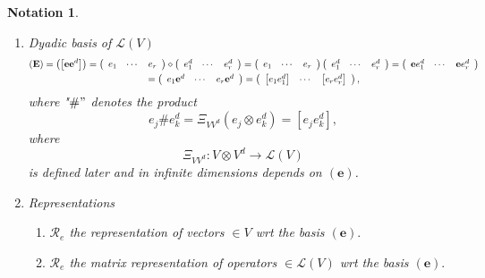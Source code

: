 \documentclass[aps,preprint]{revtex4}%
\newtheorem{notation}[theorem]{Notation}
\begin{document}
\begin{notation}
\begin{enumerate}
\item Dyadic basis of $\mathcal{L}\left(  V\right)  $%
\begin{gather}
\left(  \mathbf{E}\right)  =\left(  \left[  \mathbf{ee}^{d}\right]  \right)
=\left(
\begin{array}
[c]{ccc}%
e_{1} & \cdots & e_{r}%
\end{array}
\right)  \diamond\left(
\begin{array}
[c]{ccc}%
e_{1}^{d} & \cdots & e_{r}^{d}%
\end{array}
\right)  =\left(
\begin{array}
[c]{ccc}%
e_{1} & \cdots & e_{r}%
\end{array}
\right)  \left(
\begin{array}
[c]{ccc}%
e_{1}^{d} & \cdots & e_{r}^{d}%
\end{array}
\right)  =\left(
\begin{array}
[c]{ccc}%
\mathbf{e}e_{1}^{d} & \cdots & \mathbf{e}e_{r}^{d}%
\end{array}
\right) \\
=\left(
\begin{array}
[c]{ccc}%
e_{1}\mathbf{e}^{d} & \cdots & e_{r}\mathbf{e}^{d}%
\end{array}
\right)  =\left(
\begin{array}
[c]{ccc}%
\left[  e_{1}e_{1}^{d}\right]  & \cdots & \left[  e_{r}e_{r}^{d}\right]
\end{array}
\right)  ,
\end{gather}
where "$\#"$ denotes the product
\begin{equation}
e_{j}\#e_{k}^{d}=\Xi_{VV^{d}}\left(  e_{j}\otimes e_{k}^{d}\right)  =\left[
e_{j}e_{k}^{d}\right]  ,
\end{equation}
where%
\begin{equation}
\Xi_{VV^{d}}:V\otimes V^{d}\rightarrow\mathcal{L}\left(  V\right)
\end{equation}
is defined later and in infinite dimensions depends on $\left(  \mathbf{e}%
\right)  $.

\item Representations

\begin{enumerate}
\item $\mathcal{R}_{e}$ the representation of vectors $\in V$ wrt the basis
$\left(  \mathbf{e}\right)  .$

\item $\mathcal{R}_{e}$ the \emph{matrix} representation of operators
$\in\mathcal{L}\left(  V\right)  $ wrt the basis $\left(  \mathbf{e}\right)
.$


\end{enumerate}
\end{enumerate}
\end{notation}
\end{document}
